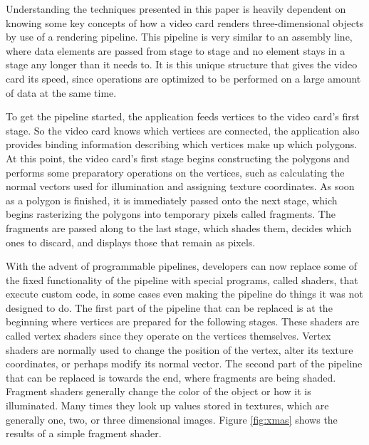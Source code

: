 \documentclass{report}
\begin{document}
Understanding the techniques presented in this paper is heavily dependent on
knowing some key concepts of how a video card renders three-dimensional objects
by use of a rendering pipeline.  This pipeline is very similar to an assembly
line, where data elements are passed from stage to stage and no element stays in
a stage any longer than it needs to.  It is this unique structure that gives the
video card its speed, since operations are optimized to be performed on a large
amount of data at the same time.

To get the pipeline started, the application feeds vertices to the video card’s
first stage.  So the video card knows which vertices are connected, the
application also provides binding information describing which vertices make up
which polygons.  At this point, the video card’s first stage begins constructing
the polygons and performs some preparatory operations on the vertices, such as
calculating the normal vectors used for illumination and assigning texture
coordinates.  As soon as a polygon is finished, it is immediately passed onto
the next stage, which begins rasterizing the polygons into temporary pixels
called fragments.  The fragments are passed along to the last stage, which
shades them, decides which ones to discard, and displays those that remain as
pixels.

With the advent of programmable pipelines, developers can now replace some of
the fixed functionality of the pipeline with special programs, called shaders,
that execute custom code, in some cases even making the pipeline do things it
was not designed to do.  The first part of the pipeline that can be replaced is
at the beginning where vertices are prepared for the following stages.  These
shaders are called vertex shaders since they operate on the vertices themselves.
Vertex shaders are normally used to change the position of the vertex, alter its
texture coordinates, or perhaps modify its normal vector.  The second part of
the pipeline that can be replaced is towards the end, where fragments are being
shaded.  Fragment shaders generally change the color of the object or how it is
illuminated.  Many times they look up values stored in textures, which are
generally one, two, or three dimensional images.  Figure \ref{fig:xmas} shows
the results of a simple fragment shader.
\end{document}
